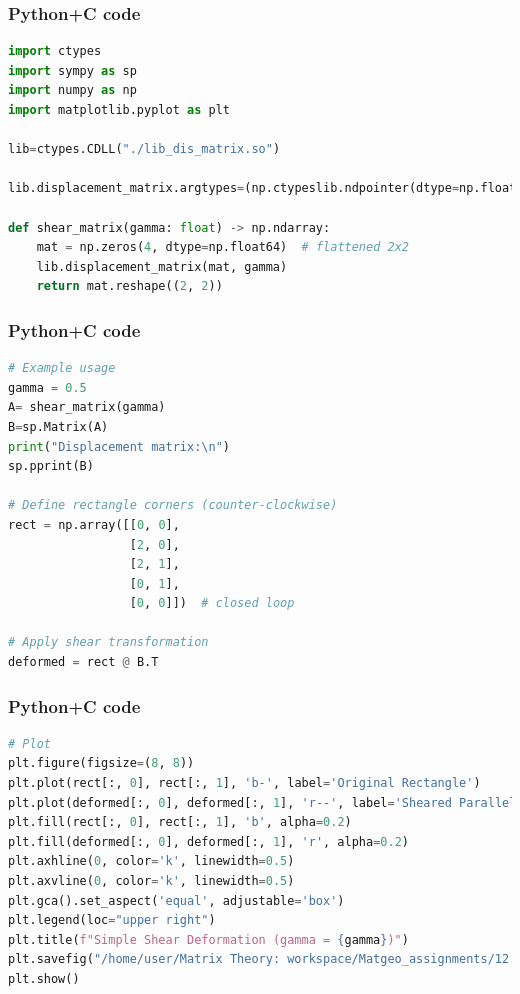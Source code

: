 \documentclass{beamer}
\begin{document}
\begin{frame}[fragile]
    \frametitle{Python+C code}

    \begin{lstlisting}[language=Python]
import ctypes
import sympy as sp
import numpy as np
import matplotlib.pyplot as plt

lib=ctypes.CDLL("./lib_dis_matrix.so")

lib.displacement_matrix.argtypes=(np.ctypeslib.ndpointer(dtype=np.float64, ndim=1, flags="C_CONTIGUOUS"),ctypes.c_double)

def shear_matrix(gamma: float) -> np.ndarray:
    mat = np.zeros(4, dtype=np.float64)  # flattened 2x2
    lib.displacement_matrix(mat, gamma)
    return mat.reshape((2, 2))

    \end{lstlisting}
\end{frame}

\begin{frame}[fragile]
    \frametitle{Python+C code}

    \begin{lstlisting}[language=Python]
# Example usage
gamma = 0.5
A= shear_matrix(gamma)
B=sp.Matrix(A)
print("Displacement matrix:\n")
sp.pprint(B)

# Define rectangle corners (counter-clockwise)
rect = np.array([[0, 0],
                 [2, 0],
                 [2, 1],
                 [0, 1],
                 [0, 0]])  # closed loop

# Apply shear transformation
deformed = rect @ B.T
    \end{lstlisting}
\end{frame}

\begin{frame}[fragile]
    \frametitle{Python+C code}

    \begin{lstlisting}[language=Python]
# Plot
plt.figure(figsize=(8, 8))
plt.plot(rect[:, 0], rect[:, 1], 'b-', label='Original Rectangle')
plt.plot(deformed[:, 0], deformed[:, 1], 'r--', label='Sheared Parallelogram')
plt.fill(rect[:, 0], rect[:, 1], 'b', alpha=0.2)
plt.fill(deformed[:, 0], deformed[:, 1], 'r', alpha=0.2)
plt.axhline(0, color='k', linewidth=0.5)
plt.axvline(0, color='k', linewidth=0.5)
plt.gca().set_aspect('equal', adjustable='box')
plt.legend(loc="upper right")
plt.title(f"Simple Shear Deformation (gamma = {gamma})")
plt.savefig("/home/user/Matrix Theory: workspace/Matgeo_assignments/12.456/figs/Figure_1.png")
plt.show()
    \end{lstlisting}
\end{frame}
\end{document}
